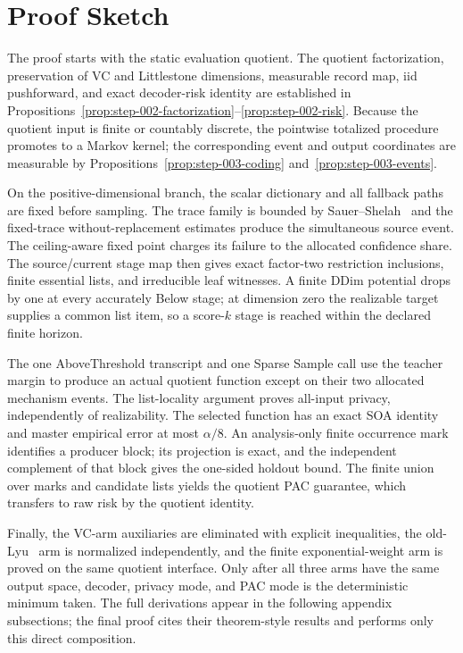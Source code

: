 \section{Proof Sketch}

The proof starts with the static evaluation quotient.  The quotient
factorization, preservation of VC and Littlestone dimensions, measurable
record map, iid pushforward, and exact decoder-risk identity are established
in Propositions~\ref{prop:step-002-factorization}--\ref{prop:step-002-risk}.
Because the quotient input is finite or countably discrete, the pointwise
totalized procedure promotes to a Markov kernel; the corresponding event and
output coordinates are measurable by Propositions~\ref{prop:step-003-coding}
and~\ref{prop:step-003-events}.

On the positive-dimensional branch, the scalar dictionary and all fallback
paths are fixed before sampling.  The trace family is bounded by
Sauer--Shelah~\citep{sauer1972}
and the fixed-trace without-replacement estimates produce the simultaneous
source event.  The ceiling-aware fixed point charges its failure to the
allocated confidence share.  The source/current stage map then gives exact
factor-two restriction inclusions, finite essential lists, and irreducible
leaf witnesses.  A finite DDim potential drops by one at every accurately
Below stage; at dimension zero the realizable target supplies a common list
item, so a score-$k$ stage is reached within the declared finite horizon.

The one AboveThreshold transcript and one Sparse Sample call use the teacher
margin to produce an actual quotient function except on their two allocated
mechanism events.  The list-locality argument proves all-input privacy,
independently of realizability.  The selected function has an exact SOA
identity and master empirical error at most $\alpha/8$.  An analysis-only
finite occurrence mark identifies a producer block; its projection is exact,
and the independent complement of that block gives the one-sided holdout
bound.  The finite union over marks and candidate lists yields the quotient
PAC guarantee, which transfers to raw risk by the quotient identity.

Finally, the VC-arm auxiliaries are eliminated with explicit inequalities,
the old-Lyu~\citep{lyu2025} arm is normalized independently, and the finite exponential-weight
arm is proved on the same quotient interface.  Only after all three arms have
the same output space, decoder, privacy mode, and PAC mode is the deterministic
minimum taken.  The full derivations appear in the following appendix
subsections; the final proof cites their theorem-style results and performs
only this direct composition.
